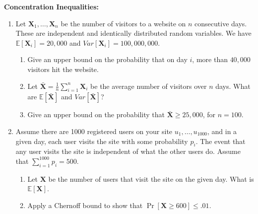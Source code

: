 \documentclass[11pt]{article}
\newcommand{\bv}[1]{\mathbf{#1}}
\newcommand{\E}{\mathbb{E}}
\begin{document}
\noindent\textbf{Concentration Inequalities:}
\begin{enumerate}
\item Let $\bv{X}_1,\ldots, \bv{X}_n$ be the number of visitors to a website on $n$ consecutive days. These are independent and identically  distributed random variables. We have $\E[\bv{X}_i] = 20,000$ and $Var[ \bv{X}_i] = 100,000,000$.
\begin{enumerate}
\item Give an upper bound on the probability that on day $i$, more than $40,000$ visitors hit the website.
\item Let $\bv{\bar X} = \frac{1}{n} \sum_{i=1}^n \bv{X}_i$ be the average number of visitors over $n$ days. What are $\E[\bv{\bar X}]$ and $Var[\bv{\bar X}]$?
\item Give an upper bound on the probability that $\bv{\bar X} \ge 25,000$, for $n = 100$.
\end{enumerate}
\item Assume there are 1000 registered users on your site $u_1,\ldots,u_{1000}$, and in a given day, each user visits the site with some probability  $p_i$. The event that any user visits the site is independent of what the other users do. Assume that $\sum_{i=1}^{1000} p_i = 500$.
\begin{enumerate}
\item Let  $\bv{X}$ be the number of users that visit the site on the given day. What is $\E[\bv{X}]$.
\item Apply a Chernoff bound to show that $\Pr[\bv{X} \ge 600] \le .01$. 
\end{enumerate}
\end{enumerate}
\end{document}
